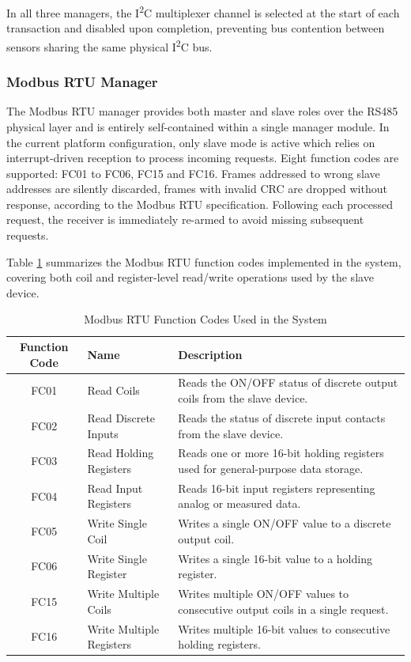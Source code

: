In all three managers, the I\textsuperscript{2}C multiplexer channel is selected at the start of
each transaction and disabled upon completion, preventing bus contention between
sensors sharing the same physical I\textsuperscript{2}C bus.

\subsubsection{Modbus RTU Manager}

The Modbus RTU manager provides both master and slave roles over the RS485 physical
layer and is entirely self-contained within a single manager module. 
In the current platform configuration, only slave mode is active which relies on
interrupt-driven reception to process incoming requests. Eight function codes are supported: FC01 to FC06, FC15 and FC16. 
Frames addressed to wrong slave addresses are silently discarded, frames with invalid CRC are dropped without response, according to the
Modbus RTU specification. Following each processed request, the receiver is immediately re-armed
to avoid missing subsequent requests.

Table \ref{tab:modbus_fc} summarizes the Modbus RTU function codes implemented in the system, covering both coil and register-level read/write operations used by the slave device.
\begin{table}[h]
    \centering
    \renewcommand{\arraystretch}{1.2}
    \begin{tabular}{|c|l|p{7cm}|}
    \hline
    \textbf{Function Code} & \textbf{Name} & \textbf{Description} \\
    \hline
    FC01 & Read Coils & Reads the ON/OFF status of discrete output coils from the slave device. \\
    \hline
    FC02 & Read Discrete Inputs & Reads the status of discrete input contacts from the slave device. \\
    \hline
    FC03 & Read Holding Registers & Reads one or more 16-bit holding registers used for general-purpose data storage. \\
    \hline
    FC04 & Read Input Registers & Reads 16-bit input registers representing analog or measured data. \\
    \hline
    FC05 & Write Single Coil & Writes a single ON/OFF value to a discrete output coil. \\
    \hline
    FC06 & Write Single Register & Writes a single 16-bit value to a holding register. \\
    \hline
    FC15 & Write Multiple Coils & Writes multiple ON/OFF values to consecutive output coils in a single request. \\
    \hline
    FC16 & Write Multiple Registers & Writes multiple 16-bit values to consecutive holding registers. \\
    \hline
    \end{tabular}
    \caption{Modbus RTU Function Codes Used in the System}
    \label{tab:modbus_fc}
\end{table}

